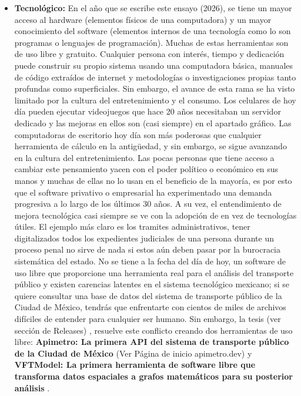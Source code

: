 \begin{itemize}
    \item \textbf{Tecnológico:} En el año que se escribe este ensayo (2026), se tiene un mayor acceso al hardware (elementos físicos de una computadora) y 
            un mayor conocimiento del software (elementos internos de una tecnología como lo son programas o lenguajes de programación). Muchas de estas herramientas 
            son de uso libre y gratuito. Cualquier persona con interés, tiempo y dedicación puede construir su propio sistema usando una computadora básica, 
            manuales de código extraídos de internet y metodologías o investigaciones propias tanto profundas como superficiales. Sin embargo, el avance de esta 
            rama se ha visto limitado por la cultura del entretenimiento y el consumo. Los celulares de hoy día pueden ejecutar videojuegos que hace 20 años necesitaban 
            un servidor dedicado y las mejoras en ellos son (casi siempre) en el apartado gráfico. Las computadoras de escritorio hoy día son más poderosas que cualquier 
            herramienta de cálculo en la antigüedad, y sin embargo, se sigue avanzando en la cultura del entretenimiento. Las pocas personas que tiene acceso a cambiar este 
            pensamiento yacen con el poder político o económico en sus manos y muchas de ellas no lo usan en el beneficio de la mayoría, es por esto que el software privativo 
            o empresarial ha experimentado una demanda progresiva a lo largo de los últimos 30 años. A su vez, el entendimiento de mejora tecnológica casi siempre se ve 
            con la adopción de  en vez de tecnologías útiles. El ejemplo más claro es los tramites administrativos, tener digitalizados todos 
            los expedientes judiciales de una persona durante un proceso penal no sirve de nada si estos aún deben pasar por la burocracia sistemática del estado. 
            No se tiene a la fecha del día de hoy, un software de uso libre que proporcione una herramienta real para el análisis del transporte público y existen carencias latentes 
            en el sistema tecnológico mexicano; si se quiere consultar una base de datos del sistema de transporte público de la Ciudad de México, tendrás que enfrentarte 
            con cientos de miles de archivos difíciles de entender para cualquier ser humano. Sin embargo, la tesis 
            \textbf{} (ver sección de Releases) \cite{galigaribaldi_tesis}, 
            resuelve este conflicto creando dos herramientas de uso libre: 
            \textbf{Apimetro: La primera API del sistema de transporte público de la Ciudad de México} (Ver Página de inicio apimetro.dev) \cite{galigaribaldi_apimetro}y 
            \textbf{VFTModel: La primera herramienta de software libre que transforma datos espaciales a grafos matemáticos para su posterior análisis} \cite{galigaribaldi_vftmodel}. 
\end{itemize}